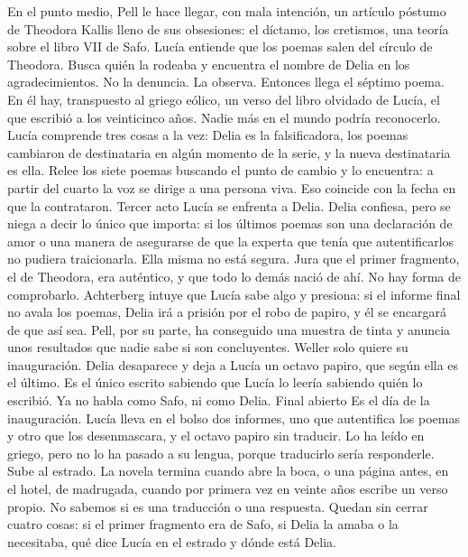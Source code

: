 En el punto medio, Pell le hace llegar, con mala intención, un artículo póstumo de Theodora Kallis lleno de sus obsesiones: el díctamo, los cretismos, una teoría sobre el libro VII de Safo. Lucía entiende que los poemas salen del círculo de Theodora. Busca quién la rodeaba y encuentra el nombre de Delia en los agradecimientos.
No la denuncia. La observa.
Entonces llega el séptimo poema. En él hay, transpuesto al griego eólico, un verso del libro olvidado de Lucía, el que escribió a los veinticinco años. Nadie más en el mundo podría reconocerlo. Lucía comprende tres cosas a la vez: Delia es la falsificadora, los poemas cambiaron de destinataria en algún momento de la serie, y la nueva destinataria es ella.
Relee los siete poemas buscando el punto de cambio y lo encuentra: a partir del cuarto la voz se dirige a una persona viva. Eso coincide con la fecha en que la contrataron.
Tercer acto
Lucía se enfrenta a Delia. Delia confiesa, pero se niega a decir lo único que importa: si los últimos poemas son una declaración de amor o una manera de asegurarse de que la experta que tenía que autentificarlos no pudiera traicionarla. Ella misma no está segura. Jura que el primer fragmento, el de Theodora, era auténtico, y que todo lo demás nació de ahí. No hay forma de comprobarlo.
Achterberg intuye que Lucía sabe algo y presiona: si el informe final no avala los poemas, Delia irá a prisión por el robo de papiro, y él se encargará de que así sea. Pell, por su parte, ha conseguido una muestra de tinta y anuncia unos resultados que nadie sabe si son concluyentes. Weller solo quiere su inauguración.
Delia desaparece y deja a Lucía un octavo papiro, que según ella es el último. Es el único escrito sabiendo que Lucía lo leería sabiendo quién lo escribió. Ya no habla como Safo, ni como Delia.
Final abierto
Es el día de la inauguración. Lucía lleva en el bolso dos informes, uno que autentifica los poemas y otro que los desenmascara, y el octavo papiro sin traducir. Lo ha leído en griego, pero no lo ha pasado a su lengua, porque traducirlo sería responderle.
Sube al estrado. La novela termina cuando abre la boca, o una página antes, en el hotel, de madrugada, cuando por primera vez en veinte años escribe un verso propio. No sabemos si es una traducción o una respuesta.
Quedan sin cerrar cuatro cosas: si el primer fragmento era de Safo, si Delia la amaba o la necesitaba, qué dice Lucía en el estrado y dónde está Delia.